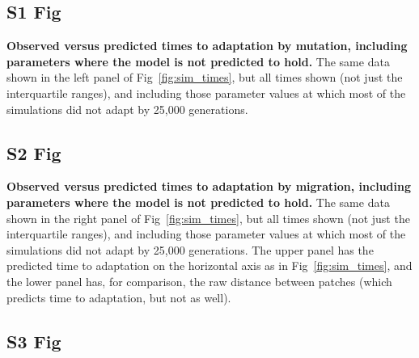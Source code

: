 \documentclass[10pt,letterpaper]{article}
\begin{document}

\subsection*{S1 Fig}
\label{sfig:sim_migration_times}

      \textbf{Observed versus predicted times to adaptation by mutation, 
      including parameters where the model is not predicted to hold.}
    The same data shown in the left panel of Fig~\ref{fig:sim_times},
    but all times shown (not just the interquartile ranges),
    and including those parameter values at which most of the simulations did not adapt by 25,000 generations.


\subsection*{S2 Fig}
\label{sfig:sim_mutation_times}

      \textbf{Observed versus predicted times to adaptation by migration, 
      including parameters where the model is not predicted to hold.}
    The same data shown in the right panel of Fig~\ref{fig:sim_times},
    but all times shown (not just the interquartile ranges),
    and including those parameter values at which most of the simulations did not adapt by 25,000 generations.
    The upper panel has the predicted time to adaptation on the horizontal axis as in Fig~\ref{fig:sim_times},
    and the lower panel has, for comparison, the raw distance between patches 
    (which predicts time to adaptation, but not as well).


\subsection*{S3 Fig}
\label{sfig:sims_1}
\end{document}
